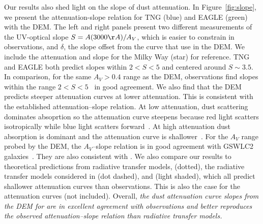 Our results also shed light on the slope of dust attenuation. In Figure~\ref{fig:slope}, 
we present the attenuation-slope relation for TNG (blue) and EAGLE (green) with the DEM.
The left and right panels present two different measurements of the UV-optical slope $S =
A(3000\AA)/A_V$, which is easier to constrain in observations, and $\delta$,
the slope offset from the \cite{calzetti2001} curve that use in the DEM. 
We include the attenuation and slope for the Milky Way (star) for reference.
TNG and EAGLE both predict slopes within $2 < S < 5$ and centered around $S\sim
3.5$. In comparison, for the same $A_V > 0.4$ range as the DEM, observations 
find slopes within the range $2 < S < 5$~\citep{calzetti2000, burgarella2005, johnson2007,
conroy2010b, wild2011, battisti2016, battisti2017, leja2017, salim2018} in good
agreement. We also find that the DEM predicts steeper attenuation curves at 
lower attenuation. This is consistent with the established attenuation--slope
relation. At low attenuation, dust scattering dominates absoprtion so the 
attenuation curve steepens because red light scatters isotropically while blue light
scatters forward~\citep{gordon1994, witt2000, draine2003}. %
At high attenuation dust absorption is dominant and the attenuation curve is
shallower~\citep{chevallard2013}. For the $A_V$ range probed by the DEM, the
$A_V$--slope relation is in good agreement with GSWLC2 galaxies~\citep[black shaded][]{salim2020}.
They are also consistent with \cite{leja2017}. We also compare our results to
theoretical predictions from radiative transfer models, \cite{inoue2005}
(dotted), the radiative transfer models considered in \cite{chevallard2013}
(dot dashed), and \cite{trayford2020} (light shaded), which all predict shallower 
attenuation curves than observations. This is also the case for the
\cite{narayanan2018} attenuation curves (not included). 
Overall, \emph{the dust attenuation curve slopes from the DEM for are in
excellent agreement with observations and better reproduces the observed
attenuation--slope relation than radiative transfer models.}



